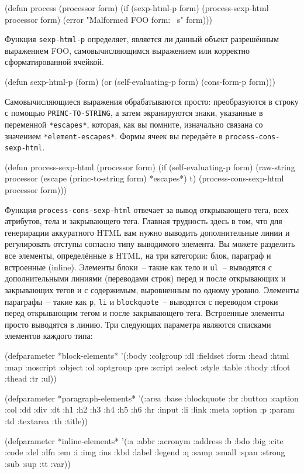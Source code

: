\begin{myverb}
(defun process (processor form)
  (if (sexp-html-p form)
    (process-sexp-html processor form)
    (error "Malformed FOO form: ~s" form)))
\end{myverb}

Функция \lstinline{sexp-html-p} определяет, является ли данный объект разрешённым выражением
FOO, самовычисляющимся выражением или корректно сформатированной ячейкой.

\begin{myverb}
(defun sexp-html-p (form)
  (or (self-evaluating-p form) (cons-form-p form)))
\end{myverb}

Самовычисляющиеся выражения обрабатываются просто: преобразуются в строку с помощью
\lstinline{PRINC-TO-STRING}, а затем экранируются знаки, указанные в переменной
\lstinline{*escapes*}, которая, как вы помните, изначально связана со значением
\lstinline{*element-escapes*}. Формы ячеек вы передаёте в \lstinline{process-cons-sexp-html}.

\begin{myverb}
(defun process-sexp-html (processor form)
  (if (self-evaluating-p form)
    (raw-string processor (escape (princ-to-string form) *escapes*) t)
    (process-cons-sexp-html processor form)))
\end{myverb}

Функция \lstinline{process-cons-sexp-html} отвечает за вывод открывающего тега, всех атрибутов,
тела и закрывающего тега. Главная трудность здесь в том, что для генерирации аккуратного
HTML вам нужно выводить дополнительные линии и регулировать отступы согласно типу
выводимого элемента. Вы можете разделить все элементы, определённые в HTML, на три
категории: блок, параграф и встроенные (inline). Элементы блоки~-- такие как тело и \lstinline{ul}~--
выводятся с дополнительными линиями (переводами строк) перед и после открывающих и
закрывающих тегов и с содержимым, выровненным по одному уровню. Элементы параграфы~--
такие как \lstinline{p}, \lstinline{li} и \lstinline{blockquote}~-- выводятся с переводом строки перед
открывающим тегом и после закрывающего тега. Встроенные элементы просто выводятся в
линию. Три следующих параметра являются списками элементов каждого типа:

\begin{myverb}
(defparameter *block-elements*
  '(:body :colgroup :dl :fieldset :form :head :html :map :noscript :object
    :ol :optgroup :pre :script :select :style :table :tbody :tfoot :thead
    :tr :ul))

(defparameter *paragraph-elements*
  '(:area :base :blockquote :br :button :caption :col :dd :div :dt :h1
    :h2 :h3 :h4 :h5 :h6 :hr :input :li :link :meta :option :p :param
    :td :textarea :th :title))

(defparameter *inline-elements*
  '(:a :abbr :acronym :address :b :bdo :big :cite :code :del :dfn :em
    :i :img :ins :kbd :label :legend :q :samp :small :span :strong :sub
    :sup :tt :var))
\end{myverb}

